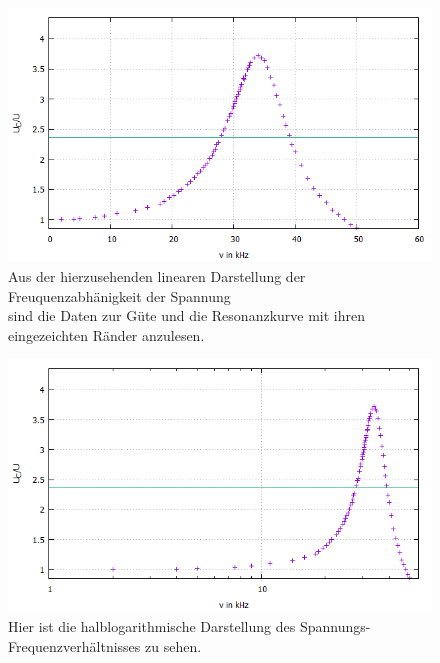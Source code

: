     \begin{figure}
      \centering
      \includegraphics[width=\textwidth]{Linear1.jpeg}
    \caption{Aus der hierzusehenden linearen Darstellung der Freuquenzabhänigkeit der Spannung \\ sind die Daten zur Güte und die Resonanzkurve mit ihren eingezeichten Ränder anzulesen.}
    \label{fig:Linear1}
    \end{figure}
    \begin{figure}
      \centering
      \includegraphics[width=\textwidth]{Halblog1.jpeg}
      \caption{Hier ist die halblogarithmische Darstellung des Spannungs-Frequenzverhältnisses zu sehen.}
      \label{fig:Halb1}
    \end{figure}

